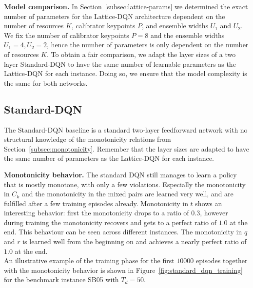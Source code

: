 \textbf{Model comparison.} In Section~\ref{subsec:lattice-params} we determined the exact number
of parameters for the Lattice-DQN architecture dependent on the number of resources $K$,
calibrator keypoints $P$, and ensemble widths $U_1$ and $U_2$. We fix the number of calibrator keypoints $P=8$ and
the ensemble widths $U_1=4, U_2=2$, hence the number of parameters is only dependent on the number of resources
$K$. To obtain a fair comparison, we adapt the layer sizes of a two layer Standard-DQN to have the same
number of learnable parameters as the Lattice-DQN for each instance. Doing so, we ensure that the model complexity is the same for both networks.


\subsection{Standard-DQN}
\label{subsec:exp-standard-dqn}

The Standard-DQN baseline is a standard two-layer feedforward network with no structural knowledge
of the monotonicity relations from Section~\ref{subsec:monotonicity}. Remember that the layer sizes are adapted to have the same number of parameters as the Lattice-DQN for each instance.

\textbf{Monotonicity behavior.} The standard DQN still manages to learn a policy that is mostly monotone, with only a few violations. Especially
the monotonicity in $C_k$ and the monotonicity in the mixed pairs are learned very well, and are fulfilled after a few training episodes already.
Monotonicity in $t$ shows an interesting behavior: first the monotonicity drops to a ratio of $0.3$,
however during training the monotonicity recovers and gets to a perfect ratio of $1.0$ at the end. This behaviour can
be seen across different instances. 
The monotonicity in $q$ and $r$ is learned well from the beginning on and achieves a nearly perfect ratio of $1.0$ at the end. \\
An illustrative example of the training phase for the first $10000$ episodes together with the monotonicity behavior is shown in Figure~\ref{fig:standard_dqn_training} for the benchmark instance SB05 with $T_d=50$.

